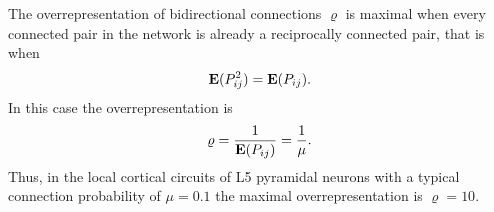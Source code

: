 
The overrepresentation of bidirectional connections $\varrho$ is maximal when every connected pair in the network is already a reciprocally connected pair, that is when
\begin{align}
\operatorname{\mathbf{E}}(P_{ij}^2) = \operatorname{\mathbf{E}}(P_{ij}).
\end{align}
%
In this case the overrepresentation is
\begin{align}
\varrho = \frac{1}{\operatorname{\mathbf{E}}(P_{ij})} = \frac{1}{\mu}.
\end{align}
Thus, in the local cortical circuits of L5 pyramidal neurons with a typical connection probability of $\mu = 0.1$ \cite{Thomson2002,Song2005} the maximal overrepresentation is $\varrho = 10$.
